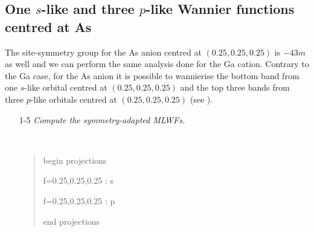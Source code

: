 \clearpage

\subsection*{One $s$-like and three $p$-like Wannier functions centred at As}

The site-symmetry group for the As anion centred at $(0.25,0.25,0.25)$ is ${-}43m$ as well and we can perform the same analysis done for the Ga cation. Contrary to the Ga case, for the As anion it is possible to wannierise the bottom band from one $s$-like orbital centred at $(0.25,0.25,0.25)$ and the top three bands from three $p$-like orbitals centred at $(0.25,0.25,0.25)$ (see ).

\begin{itemize}
	\item[1-5] {\it Compute the symmetry-adapted MLWFs.}

{\tt
\begin{quote}
begin projections

f=0.25,0.25,0.25 : s

f=0.25,0.25,0.25 : p

end projections
\end{quote}
}



\end{itemize}
